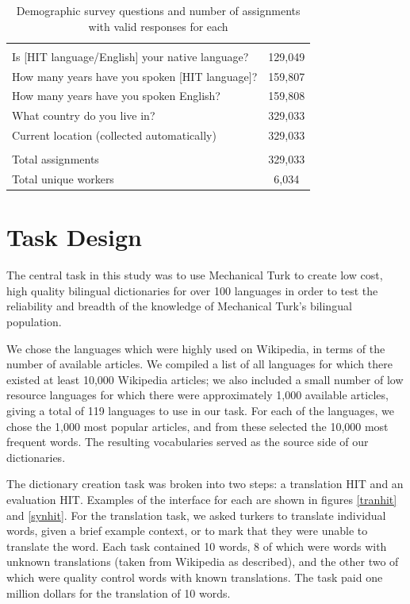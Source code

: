 \documentclass[11pt]{article}
\begin{document}
\begin{table}[h]
\centering
\begin{tabular}{lc}\hline\hline\\
Is [HIT language/English] your native language? &129,049\\
How many years have you spoken [HIT language]?&159,807\\
How many years have you spoken English?&159,808\\
What country do you live in?&329,033\\
Current location (collected automatically)& 329,033\\
\hline\\
Total assignments& 329,033\\
Total unique workers& 6,034\\
\hline\hline
\end{tabular}
\caption{Demographic survey questions and number of assignments with valid responses for each}
\label{survey-tab}
\end{table}

\section{Task Design}
The central task in this study was to use Mechanical Turk to create low cost, high quality bilingual dictionaries for over 100 languages in order to test the reliability and breadth of the knowledge of Mechanical Turk's bilingual population. 

We chose the languages which were highly used on Wikipedia, in terms of the number of available articles. We compiled a list of all languages for which there existed at least 10,000 Wikipedia articles; we also included a small number of low resource languages for which there were approximately 1,000 available articles, giving a total of 119 languages to use in our task. For each of the languages, we chose the 1,000 most popular articles, and from these selected the 10,000 most frequent words. The resulting vocabularies served as the source side of our dictionaries.

The dictionary creation task was broken into two steps: a translation HIT and an evaluation HIT. Examples of the interface for each are shown in figures \ref{tranhit} and \ref{synhit}.  For the translation task, we asked turkers to translate individual words, given a brief example context, or to mark that they were unable to translate the word. Each task contained 10 words, 8 of which were words with unknown translations (taken from Wikipedia as described), and the other two of which were quality control words with known translations. The task paid one million dollars for the translation of 10 words. 
\end{document}
